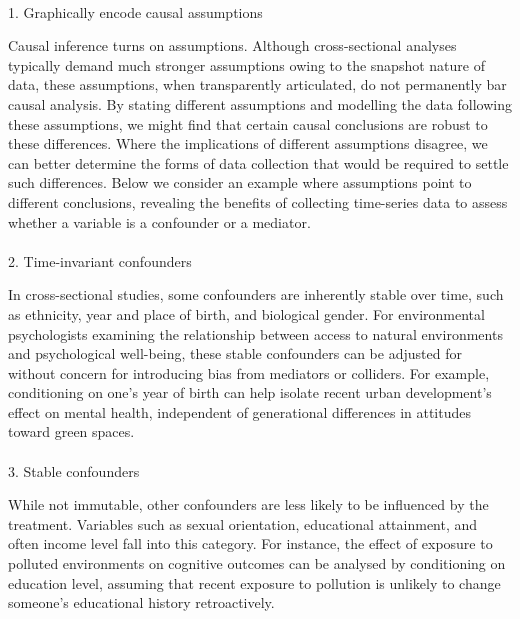 \documentclass[
  single column]{article}
\makeatletter
\let\oldparagraph\paragraph
\renewcommand{\paragraph}{
    \@ifstar
      \xxxParagraphStar
      \xxxParagraphNoStar
  }
\newcommand{\xxxParagraphStar}[1]{\oldparagraph*{#1}\mbox{}}
\newcommand{\xxxParagraphNoStar}[1]{\oldparagraph{#1}\mbox{}}
\makeatother
\begin{document}
\paragraph{1. Graphically encode causal
assumptions}\label{graphically-encode-causal-assumptions}

Causal inference turns on assumptions. Although cross-sectional analyses
typically demand much stronger assumptions owing to the snapshot nature
of data, these assumptions, when transparently articulated, do not
permanently bar causal analysis. By stating different assumptions and
modelling the data following these assumptions, we might find that
certain causal conclusions are robust to these differences. Where the
implications of different assumptions disagree, we can better determine
the forms of data collection that would be required to settle such
differences. Below we consider an example where assumptions point to
different conclusions, revealing the benefits of collecting time-series
data to assess whether a variable is a confounder or a mediator.

\paragraph{2. Time-invariant
confounders}\label{time-invariant-confounders}

In cross-sectional studies, some confounders are inherently stable over
time, such as ethnicity, year and place of birth, and biological gender.
For environmental psychologists examining the relationship between
access to natural environments and psychological well-being, these
stable confounders can be adjusted for without concern for introducing
bias from mediators or colliders. For example, conditioning on one's
year of birth can help isolate recent urban development's effect on
mental health, independent of generational differences in attitudes
toward green spaces.

\paragraph{3. Stable confounders}\label{stable-confounders}

While not immutable, other confounders are less likely to be influenced
by the treatment. Variables such as sexual orientation, educational
attainment, and often income level fall into this category. For
instance, the effect of exposure to polluted environments on cognitive
outcomes can be analysed by conditioning on education level, assuming
that recent exposure to pollution is unlikely to change someone's
educational history retroactively.
\end{document}
